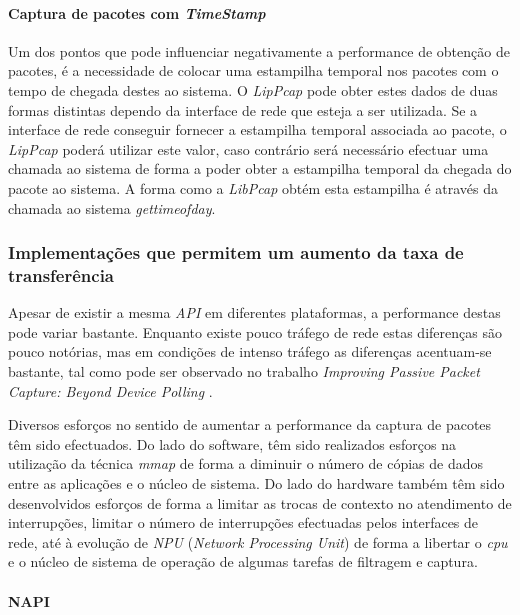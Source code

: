 \paragraph{Captura de pacotes com \textit{TimeStamp}}
Um dos pontos que pode influenciar negativamente a performance de obtenção de pacotes, é a necessidade de colocar uma estampilha temporal nos pacotes com o tempo de chegada destes ao sistema.
O \textit{LipPcap} pode obter estes dados de duas formas distintas dependo da interface de rede que esteja a ser utilizada.
Se a interface de rede conseguir fornecer a estampilha temporal associada ao pacote, o \textit{LipPcap} poderá utilizar este valor, caso contrário será necessário efectuar uma chamada ao sistema de forma a poder obter a estampilha temporal da chegada do pacote ao sistema.
A forma como a \textit{LibPcap} obtém esta estampilha é através da chamada ao sistema \textit{gettimeofday}.

\subsubsection{Implementações que permitem um aumento da taxa de transferência}

Apesar de existir a mesma \textit{API} em diferentes plataformas, a performance destas pode variar bastante.
Enquanto existe pouco tráfego de rede estas diferenças são pouco notórias, mas em condições de intenso tráfego as diferenças acentuam-se bastante, tal como pode ser observado no trabalho \textit{Improving Passive Packet Capture: Beyond Device Polling} \cite{Deri2004}.

Diversos esforços no sentido de aumentar a performance da captura de pacotes têm sido efectuados.
Do lado do software, têm sido realizados esforços na utilização da técnica \textit{mmap} de forma a diminuir o número de cópias de dados entre as aplicações e o núcleo de sistema.
Do lado do hardware também têm sido desenvolvidos esforços de forma a limitar as trocas de contexto no atendimento de interrupções, limitar o número de interrupções efectuadas pelos interfaces de rede, até à evolução de \textit{NPU} (\textit{Network Processing Unit}) de forma a libertar o \textit{cpu} e o núcleo de sistema de operação de algumas tarefas de filtragem e captura.

\paragraph*{NAPI}

